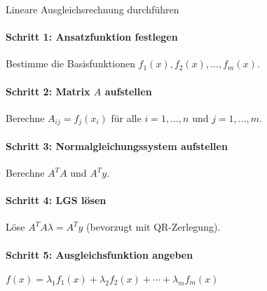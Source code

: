 \begin{KR}{Lineare Ausgleichsrechnung durchführen}\\
\paragraph{Schritt 1: Ansatzfunktion festlegen}
Bestimme die Basisfunktionen $f_1(x), f_2(x), ..., f_m(x)$.

\paragraph{Schritt 2: Matrix $A$ aufstellen}
Berechne $A_{ij} = f_j(x_i)$ für alle $i = 1, ..., n$ und $j = 1, ..., m$.

\paragraph{Schritt 3: Normalgleichungssystem aufstellen}
Berechne $A^T A$ und $A^T y$.

\paragraph{Schritt 4: LGS lösen}
Löse $A^T A \lambda = A^T y$ (bevorzugt mit QR-Zerlegung).

\paragraph{Schritt 5: Ausgleichsfunktion angeben}
$f(x) = \lambda_1 f_1(x) + \lambda_2 f_2(x) + \cdots + \lambda_m f_m(x)$
\end{KR}

